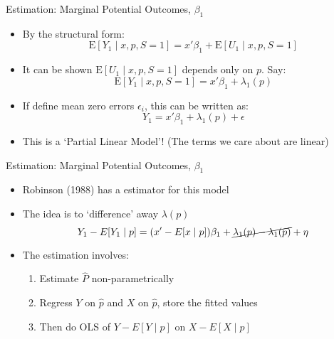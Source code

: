 \documentclass{beamer}
\begin{document}
\begin{frame}{Estimation:  Marginal Potential Outcomes, $\beta_1$}
  \begin{itemize}
\item By the structural form:
\begin{equation*}
  \mathrm{E}[Y_1\mid x, p,S=1] = x'\beta_1 +  \mathrm{E}[U_1\mid x,p,
  S=1   ]
\end{equation*}
\item It can be shown $\mathrm{E}[U_1\mid x,p,
  S=1   ]$ depends only on $p$. Say: 
  \begin{equation*}
    \mathrm{E}[Y_1\mid x, p,S=1] = x'\beta_1 +  \lambda_1(p)
  \end{equation*}
\item If define mean zero errors $\epsilon_i$, this can be written as:
 \begin{equation*}
    Y_1 = x'\beta_1 +  \lambda_1(p) + \epsilon
  \end{equation*}
\item This is a `Partial Linear Model'! (The terms we care about are linear)
\end{itemize}
\end{frame}

\begin{frame}{Estimation:  Marginal Potential Outcomes, $\beta_1$}
  \begin{itemize}
  \item Robinson (1988) has a estimator for this model
\item The idea is to
  `difference' away $\lambda(p)$
  \begin{equation*}
Y_1 - E[Y_1\mid p] = (x'-E[x\mid p])\beta_1 +  \cancel{\lambda_1(p) - \lambda_1(p)} + \eta
\end{equation*}
\item The estimation involves:
\begin{enumerate}
\item Estimate $\hat{P}$ non-parametrically 
\item Regress $Y$ on $\hat{p}$ and $X$ on $\hat{p}$, store the fitted values
\item Then do OLS of $Y - E[Y\mid p]$ on $X -
   E[X\mid p]$
\end{enumerate}
  \end{itemize}
  
\end{frame}
\end{document}
